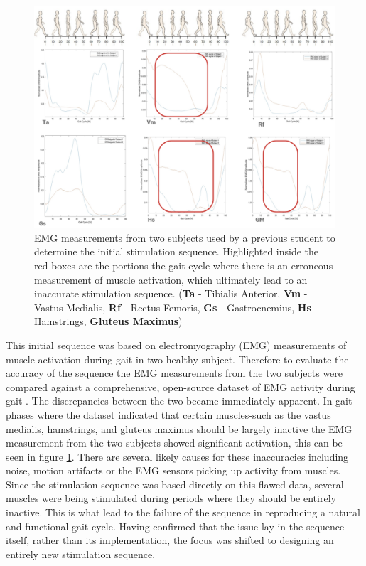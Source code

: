 \begin{figure} [h]
    \centering
    \includegraphics[width=0.99\linewidth]{images/wrongemg.png}
    \caption{EMG measurements from two subjects used by a previous student to determine the initial stimulation sequence. Highlighted inside the red boxes are the portions the gait cycle where there is an erroneous measurement of muscle activation, which ultimately lead to an inaccurate stimulation sequence. (\textbf{Ta} - Tibialis Anterior, \textbf{Vm} - Vastus Medialis, \textbf{Rf} - Rectus Femoris, \textbf{Gs} - Gastrocnemius, \textbf{Hs} - Hamstrings, \textbf{Gluteus Maximus})}
    \label{fig:wrongemg}
\end{figure}

This initial sequence was based on electromyography (EMG) measurements of muscle activation during gait in two healthy subject. Therefore to evaluate the accuracy of the sequence the EMG measurements from the two subjects were compared against a comprehensive, open-source dataset of EMG activity during gait \cite{camargo_comprehensive_2021}. The discrepancies between the two became immediately apparent. In gait phases where the dataset indicated that certain muscles-such as the vastus medialis, hamstrings, and gluteus maximus should be largely inactive the EMG measurement from the two subjects showed significant activation, this can be seen in figure \ref{fig:wrongemg}. There are several likely causes for these inaccuracies including noise, motion artifacts or the EMG sensors picking up activity from muscles. Since the stimulation sequence was based directly on this flawed data, several muscles were being stimulated during periods where they should be entirely inactive. This is what lead to the failure of the sequence in reproducing a natural and functional gait cycle. Having confirmed that the issue lay in the sequence itself, rather than its implementation, the focus was shifted to designing an entirely new stimulation sequence.

